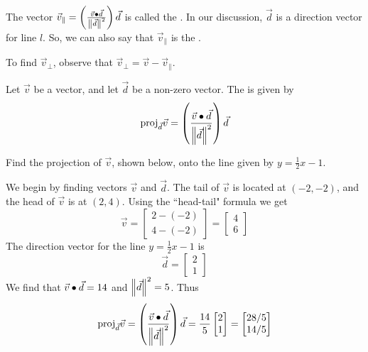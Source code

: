 \documentclass{ximera}
\begin{document}
    The vector $\vec{v}_{\parallel}=\left(\frac{\vec{v}\bullet\vec{d}}{\left\|\vec{d}\right\|^2}\right)\vec{d}$ is called the .  In our discussion, $\vec{d}$ is a direction vector for line $l$.  So, we can also say that $\vec{v}_{\parallel}$ is the .
     
    To find $\vec{v}_{\perp}$, observe that $\vec{v}_{\perp}=\vec{v}-\vec{v}_{\parallel}$.
     
     
    \begin{definition}\label{def:projection}
    Let $\vec{v}$ be a vector, and let $\vec{d}$ be a non-zero vector.  The  is given by
    $$\mbox{proj}_{\vec{d}}\vec{v}=\left(\frac{\vec{v}\bullet\vec{d}}{\left\|\vec{d}\right\|^2}\right)\vec{d}$$
    \end{definition}
     
    \begin{example}\label{ex:projection1}
    Find the projection of $\vec{v}$, shown below, onto the line given by $y=\frac{1}{2}x-1$.
     
    \begin{center}
    \end{center}
     
    \begin{explanation}
    We begin by finding vectors $\vec{v}$ and $\vec{d}$. The tail of $\vec{v}$ is located at $(-2, -2)$, and the head of $\vec{v}$ is at $(2, 4)$.  Using the ``head-tail" formula we get
    $$\vec{v}=\begin{bmatrix}2-(-2)\\4-(-2)\end{bmatrix}=\begin{bmatrix}4\\6\end{bmatrix}$$ The direction vector for the line $y=\frac{1}{2}x-1$ is $$\vec{d}=\begin{bmatrix}2\\1\end{bmatrix}$$
    We find that $\vec{v}\bullet\vec{d}=14$ and $\left\|\vec{d}\right\|^2=5$.
    Thus $$\mbox{proj}_{\vec{d}}\vec{v}=\left(\frac{\vec{v}\bullet\vec{d}}{\left\|\vec{d}\right\|^2}\right)\vec{d}=\frac{14}{5}\begin{bmatrix}2\\1\end{bmatrix}=\begin{bmatrix}28/5\\14/5\end{bmatrix}$$
    \end{explanation}
    \end{example}
     
\end{document}
